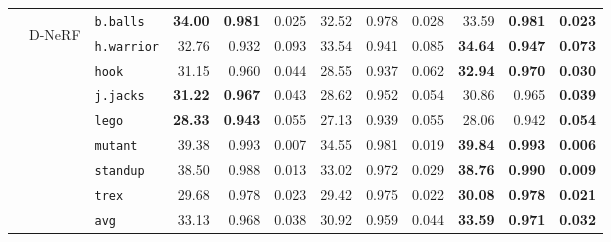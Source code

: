 \documentclass{article}
\theoremstyle{plain}
\theoremstyle{definition}
\theoremstyle{remark}
\begin{document}
\begin{table}[bp]
{\begin{tabular}{@{\hskip 2pt}cc|@{\hskip 2pt}l@{\hskip 2pt}|@{\hskip 2pt}r@{\hskip 2pt}r@{\hskip 2pt}r|@{\hskip 2pt}r@{\hskip 2pt}r@{\hskip 2pt}r|@{\hskip 2pt}r@{\hskip 2pt}r@{\hskip 2pt}r@{\hskip 2pt}}
& \multirow{9}{*}{\begin{sideways}D-NeRF\end{sideways}}
        & \texttt{b.balls}  & \bf 34.00 & \bf 0.981 & 0.025 & 32.52 & 0.978 & 0.028 &  33.59 & \bf 0.981 & \bf 0.023 \\
        & & \texttt{h.warrior}& 32.76 & 0.932 & 0.093 & 33.54 & 0.941 & 0.085 & \bf 34.64 & \bf 0.947 & \bf 0.073 \\
        & & \texttt{hook}     & 31.15 & 0.960 & 0.044 & 28.55 & 0.937 & 0.062 & \bf 32.94 & \bf 0.970 & \bf 0.030 \\
        & & \texttt{j.jacks}  & \bf 31.22 & \bf 0.967 & 0.043 & 28.62 & 0.952 & 0.054 & 30.86 & 0.965 & \bf 0.039 \\
        & & \texttt{lego}     & \bf 28.33 & \bf 0.943 & 0.055 & 27.13 & 0.939 &  0.055 & 28.06 & 0.942 & \bf 0.054 \\
        & & \texttt{mutant}   & 39.38 & 0.993 & 0.007 & 34.55 & 0.981 & 0.019 & \bf 39.84 & \bf 0.993 & \bf 0.006 \\
        & & \texttt{standup}  & 38.50 & 0.988 & 0.013 & 33.02 & 0.972 & 0.029 & \bf 38.76 & \bf 0.990 & \bf 0.009 \\
        & & \texttt{trex}     & 29.68 & 0.978 & 0.023 & 29.42 & 0.975 & 0.022 & \bf 30.08 & \bf 0.978 & \bf 0.021 \\
    \cmidrule{3-12}
        & & \texttt{avg}
          & 33.13
          & 0.968
          & 0.038
          & 30.92
          & 0.959
          & 0.044
          & \bf 33.59
          & \bf 0.971
          & \bf 0.032 \\
    \bottomrule
    \end{tabular}
    }
  \label{tab:detailed_combined}
\end{table}
\end{document}
